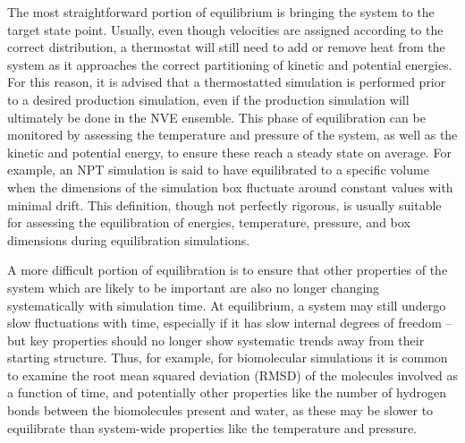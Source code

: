\documentclass[9pt,bestpractices]{livecoms}
\begin{document}
The most straightforward portion of equilibrium is bringing the system to the target state point.
Usually, even though velocities are assigned according to the correct distribution, a thermostat will still need to add or remove heat from the system as it approaches the correct partitioning of kinetic and potential energies.
For this reason, it is advised that a thermostatted simulation is performed prior to a desired production simulation, even if the production simulation will ultimately be done in the NVE ensemble.
This phase of equilibration can be monitored by assessing the temperature and pressure of the system, as well as the kinetic and potential energy, to ensure these reach a steady state on average.
For example, an NPT simulation is said to have equilibrated to a specific volume when the dimensions of the simulation box fluctuate around constant values with minimal drift.
This definition, though not perfectly rigorous, is usually suitable for assessing the equilibration of energies, temperature, pressure, and box dimensions during equilibration simulations.

A more difficult portion of equilibration is to ensure that other properties of the system which are likely to be important are also no longer changing systematically with simulation time.
At equilibrium, a system may still undergo slow fluctuations with time, especially if it has slow internal degrees of freedom -- but key properties should no longer show systematic trends away from their starting structure.
Thus, for example, for biomolecular simulations it is common to examine the root mean squared deviation (RMSD) of the molecules involved as a function of time, and potentially other properties like the number of hydrogen bonds between the biomolecules present and water, as these may be slower to equilibrate than system-wide properties like the temperature and pressure.
\end{document}
